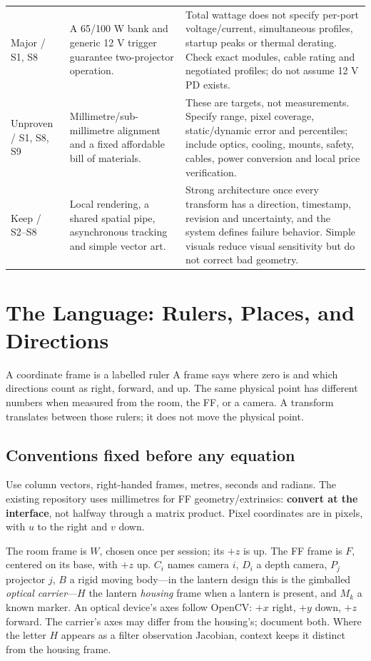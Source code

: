 \documentclass[11pt,a4paper]{article}
\begin{document}
\begin{longtable}{@{}L{25mm}L{56mm}L{74mm}@{}}
Major / S1, S8 &
A 65/100 W bank and generic 12 V trigger guarantee two-projector operation. &
Total wattage does not specify per-port voltage/current, simultaneous
profiles, startup peaks or thermal derating. Check exact modules, cable
rating and negotiated profiles; do not assume 12 V PD exists.\\
Unproven / S1, S8, S9 &
Millimetre/sub-millimetre alignment and a fixed affordable bill of materials. &
These are targets, not measurements. Specify range, pixel coverage,
static/dynamic error and percentiles; include optics, cooling, mounts,
safety, cables, power conversion and local price verification.\\
Keep / S2--S8 &
Local rendering, a shared spatial pipe, asynchronous tracking and simple
vector art. &
Strong architecture once every transform has a direction, timestamp,
revision and uncertainty, and the system defines failure behavior.
Simple visuals reduce visual sensitivity but do not correct bad geometry.\\
\end{longtable}
\normalsize

\section{The Language: Rulers, Places, and Directions}
\label{sec:notation}

\begin{plain}{A coordinate frame is a labelled ruler}
A frame says where zero is and which directions count as right, forward,
and up. The same physical point has different numbers when measured from
the room, the FF, or a camera. A transform translates between those rulers;
it does not move the physical point.
\end{plain}

\subsection{Conventions fixed before any equation}
Use column vectors, right-handed frames, metres, seconds and radians.
The existing repository uses millimetres for FF geometry/extrinsics:
\textbf{convert at the interface}, not halfway through a matrix product.
Pixel coordinates are in pixels, with $u$ to the right and $v$ down.

The room frame is $W$, chosen once per session; its $+z$ is up.
The FF frame is $F$, centered on its base, with $+z$ up.
$C_i$ names camera $i$, $D_i$ a depth camera, $P_j$ projector $j$,
$B$ a rigid moving body---in the lantern design this is the gimballed
\emph{optical carrier}---$H$ the lantern \emph{housing} frame when a
lantern is present, and $M_k$ a known marker.
An optical device's axes follow OpenCV: $+x$ right, $+y$ down, $+z$ forward.
The carrier's axes may differ from the housing's; document both.
Where the letter $H$ appears as a filter observation Jacobian, context
keeps it distinct from the housing frame.
\end{document}
